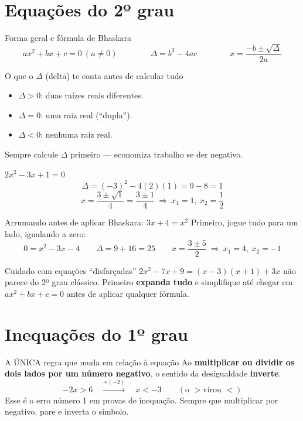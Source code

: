 \documentclass[12pt,a4paper]{article}
\begin{document}
\section{Equações do 2º grau}

\begin{definicao}{Forma geral e fórmula de Bhaskara}
\[
ax^2+bx+c=0 \ (a\neq0) \qquad\qquad \Delta = b^2-4ac \qquad\qquad x = \frac{-b\pm\sqrt{\Delta}}{2a}
\]
\end{definicao}

\begin{dica}{O que o $\Delta$ (delta) te conta antes de calcular tudo}
\begin{itemize}[nosep]
  \item $\Delta>0$: duas raízes reais diferentes.
  \item $\Delta=0$: uma raiz real (``dupla'').
  \item $\Delta<0$: nenhuma raiz real.
\end{itemize}
Sempre calcule $\Delta$ primeiro — economiza trabalho se der negativo.
\end{dica}

\begin{exemplo}{$2x^2-3x+1=0$}
\[
\Delta = (-3)^2-4(2)(1) = 9-8=1
\]
\[
x = \frac{3\pm\sqrt1}{4} = \frac{3\pm1}{4} \ \Rightarrow\ x_1=1,\ x_2=\frac12
\]
\end{exemplo}

\begin{exemplo}{Arrumando antes de aplicar Bhaskara: $3x+4=x^2$}
Primeiro, jogue tudo para um lado, igualando a zero:
\[
0 = x^2-3x-4 \qquad \Delta=9+16=25 \qquad x=\frac{3\pm5}{2} \ \Rightarrow\ x_1=4,\ x_2=-1
\]
\end{exemplo}

\begin{atencao}{Cuidado com equações ``disfarçadas''}
$2x^2-7x+9 = (x-3)(x+1)+3x$ não parece do 2º grau clássico. Primeiro
\textbf{expanda tudo} e simplifique até chegar em $ax^2+bx+c=0$ antes de
aplicar qualquer fórmula.
\end{atencao}

\section{Inequações do 1º grau}

\begin{atencao}{A ÚNICA regra que muda em relação à equação}
Ao \textbf{multiplicar ou dividir os dois lados por um número negativo},
o sentido da desigualdade \textbf{inverte}.
\[
-2x > 6 \quad\xrightarrow{\div(-2)}\quad x < -3 \qquad(\text{o } > \text{virou } <)
\]
Esse é o erro número 1 em provas de inequação. Sempre que multiplicar por
negativo, pare e inverta o símbolo.
\end{atencao}
\end{document}
